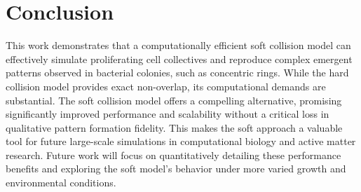 \documentclass[conference]{IEEEtran}
\begin{document}
\newpage

\section{Conclusion}

This work demonstrates that a computationally efficient soft collision model can effectively simulate proliferating cell collectives and reproduce complex emergent patterns observed in bacterial colonies, such as concentric rings. While the hard collision model provides exact non-overlap, its computational demands are substantial. The soft collision model offers a compelling alternative, promising significantly improved performance and scalability without a critical loss in qualitative pattern formation fidelity. This makes the soft approach a valuable tool for future large-scale simulations in computational biology and active matter research. Future work will focus on quantitatively detailing these performance benefits and exploring the soft model's behavior under more varied growth and environmental conditions.




\end{document}
